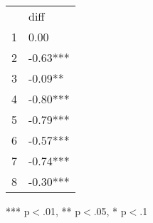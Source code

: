 \documentclass{article}
\begin{document}
\begin{table}[!h]
\centering
\begin{tabular}{ll}
\cline{1-2}
\multicolumn{1}{|l}{} &
  \multicolumn{1}{|l|}{diff} \\
\cline{1-2}
\multicolumn{1}{|l}{1} &
  \multicolumn{1}{|l|}{0.00} \\
\cline{1-2}
\multicolumn{1}{|l}{2} &
  \multicolumn{1}{|l|}{-0.63***} \\
\cline{1-2}
\multicolumn{1}{|l}{3} &
  \multicolumn{1}{|l|}{-0.09**} \\
\cline{1-2}
\multicolumn{1}{|l}{4} &
  \multicolumn{1}{|l|}{-0.80***} \\
\cline{1-2}
\multicolumn{1}{|l}{5} &
  \multicolumn{1}{|l|}{-0.79***} \\
\cline{1-2}
\multicolumn{1}{|l}{6} &
  \multicolumn{1}{|l|}{-0.57***} \\
\cline{1-2}
\multicolumn{1}{|l}{7} &
  \multicolumn{1}{|l|}{-0.74***} \\
\cline{1-2}
\multicolumn{1}{|l}{8} &
  \multicolumn{1}{|l|}{-0.30***} \\
\cline{1-2}
\end{tabular}

\footnotesize{
*** p$<$.01, ** p$<$.05, * p$<$.1
}
\end{table}
\end{document}
